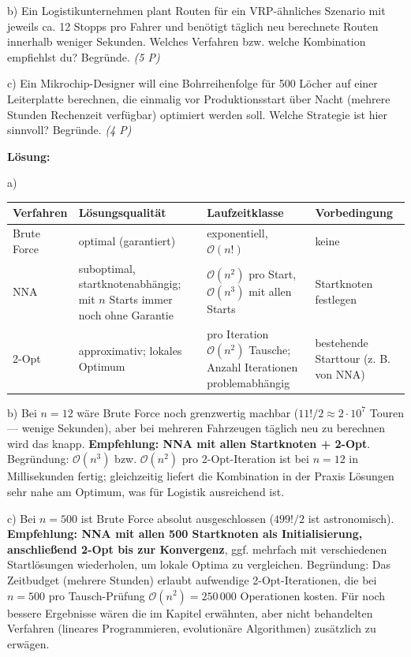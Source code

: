 \documentclass[11pt, a4paper]{article}
\begin{document}
b) Ein Logistikunternehmen plant Routen für ein VRP-ähnliches Szenario mit jeweils ca. 12 Stopps pro Fahrer und benötigt täglich neu berechnete Routen innerhalb weniger Sekunden. Welches Verfahren bzw. welche Kombination empfiehlst du? Begründe. \textit{(5 P)}


c) Ein Mikrochip-Designer will eine Bohrreihenfolge für 500 Löcher auf einer Leiterplatte berechnen, die einmalig vor Produktionsstart über Nacht (mehrere Stunden Rechenzeit verfügbar) optimiert werden soll. Welche Strategie ist hier sinnvoll? Begründe. \textit{(4 P)}


\textbf{Lösung:}


a)



{\small
\begin{tabularx}{\linewidth}{XXXX}
\hline
\rowcolor{tableheadbg}
{\color{white}\textbf{Verfahren}} & {\color{white}\textbf{Lösungsqualität}} & {\color{white}\textbf{Laufzeitklasse}} & {\color{white}\textbf{Vorbedingung}} \\[2pt]
\hline
\endhead
\hline
\endfoot
Brute Force & optimal (garantiert) & exponentiell, $\mathcal{O}(n!)$ & keine \\
NNA & suboptimal, startknotenabhängig; mit $n$ Starts immer noch ohne Garantie & $\mathcal{O}(n^2)$ pro Start, $\mathcal{O}(n^3)$ mit allen Starts & Startknoten festlegen \\
2-Opt & approximativ; lokales Optimum & pro Iteration $\mathcal{O}(n^2)$ Tausche; Anzahl Iterationen problemabhängig & bestehende Starttour (z. B. von NNA) \\
\end{tabularx}
}


b) Bei $n=12$ wäre Brute Force noch grenzwertig machbar ($11!/2 \approx 2\cdot 10^7$ Touren — wenige Sekunden), aber bei mehreren Fahrzeugen täglich neu zu berechnen wird das knapp. \textbf{Empfehlung: NNA mit allen Startknoten + 2-Opt}. Begründung: $\mathcal{O}(n^3)$ bzw. $\mathcal{O}(n^2)$ pro 2-Opt-Iteration ist bei $n=12$ in Millisekunden fertig; gleichzeitig liefert die Kombination in der Praxis Lösungen sehr nahe am Optimum, was für Logistik ausreichend ist.


c) Bei $n=500$ ist Brute Force absolut ausgeschlossen ($499!/2$ ist astronomisch). \textbf{Empfehlung: NNA mit allen 500 Startknoten als Initialisierung, anschließend 2-Opt bis zur Konvergenz}, ggf. mehrfach mit verschiedenen Startlösungen wiederholen, um lokale Optima zu vergleichen. Begründung: Das Zeitbudget (mehrere Stunden) erlaubt aufwendige 2-Opt-Iterationen, die bei $n=500$ pro Tausch-Prüfung $\mathcal{O}(n^2)=250\,000$ Operationen kosten. Für noch bessere Ergebnisse wären die im Kapitel erwähnten, aber nicht behandelten Verfahren (lineares Programmieren, evolutionäre Algorithmen) zusätzlich zu erwägen.
\end{document}
